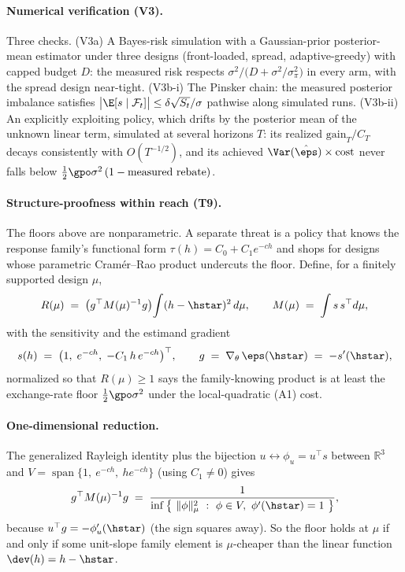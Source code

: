 \paragraph{Numerical verification (V3).}
Three checks. (V3a) A Bayes-risk simulation with a Gaussian-prior
posterior-mean estimator under three designs (front-loaded, spread,
adaptive-greedy) with capped budget $D$: the measured risk respects
$\sigma^2/\big(D+\sigma^2/\sigma_{\pi}^2\big)$ in every arm, with the spread
design near-tight. (V3b-i) The Pinsker chain: the measured posterior
imbalance satisfies
$\big|\E[s\mid\mathcal{F}_t]\big| \le \delta\sqrt{S_t}/\sigma$ pathwise
along simulated runs. (V3b-ii) An explicitly exploiting policy, which
drifts by the posterior mean of the unknown linear term, simulated at
several horizons $T$: its realized $\mathrm{gain}_T/C_T$ decays
consistently with $O(T^{-1/2})$, and its achieved
$\Var(\hat\eps)\times\text{cost}$ never falls below
$\tfrac{1}{2}\gpo\sigma^2\,(1-\text{measured rebate})$.

\paragraph{Structure-proofness within reach (T9).}
The floors above are nonparametric. A separate threat is a policy that
knows the response family's functional form $\tau(h)=C_0+C_1 e^{-ch}$ and
shops for designs whose parametric Cram\'er--Rao product undercuts the
floor. Define, for a finitely supported design $\mu$,
\begin{equation*}
R(\mu) \;=\; \big(g^\top M(\mu)^{-1} g\big)\!\int (h-\hstar)^2\, d\mu,
\qquad
M(\mu) \;=\; \int s\, s^\top d\mu,
\end{equation*}
with the sensitivity and the estimand gradient
\begin{equation*}
s(h) \;=\; \big(1,\; e^{-ch},\; -C_1\, h\, e^{-ch}\big)^\top,
\qquad
g \;=\; \nabla_\theta\, \eps(\hstar) \;=\; -s'(\hstar),
\end{equation*}
normalized so that $R(\mu)\ge 1$ says the family-knowing product is at
least the exchange-rate floor $\tfrac{1}{2}\gpo\sigma^2$ under the
local-quadratic (A1) cost.

\paragraph{One-dimensional reduction.}
The generalized Rayleigh identity plus the bijection
$u \leftrightarrow \phi_u = u^\top s$ between $\mathbb{R}^3$ and
$V=\operatorname{span}\{1,\ e^{-ch},\ h e^{-ch}\}$ (using $C_1\neq 0$)
gives
\begin{equation*}
g^\top M(\mu)^{-1} g
\;=\; \frac{1}{\inf\big\{\ \|\phi\|_\mu^2 \ :\ \phi\in V,\
\phi'(\hstar)=1\ \big\}},
\end{equation*}
because $u^\top g = -\phi_u'(\hstar)$ (the sign squares away). So the floor
holds at $\mu$ if and only if some unit-slope family element is
$\mu$-cheaper than the linear function $\dev(h)=h-\hstar$.

